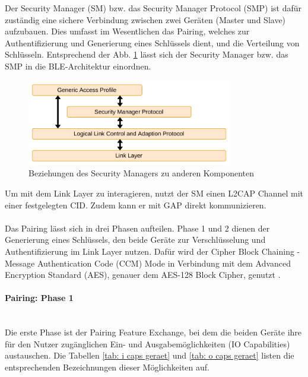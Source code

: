 Der Security Manager (SM) bzw. das Security Manager Protocol (SMP) ist dafür zuständig eine sichere Verbindung zwischen zwei Geräten (Master und Slave) aufzubauen. Dies umfasst im Wesentlichen das Pairing, welches zur Authentifizierung und Generierung eines Schlüssels dient, und die Verteilung von Schlüsseln. Entsprechend der Abb. \ref{fig: smp in bt} lässt sich der Security Manager bzw. das SMP in die BLE-Architektur einordnen.

\begin{figure}[H]
    \centering
    \includegraphics[width=0.8\textwidth]{graphics/smp_in_bt.pdf}
    \caption[Beziehungen des Security Managers zu anderen Komponenten]{Beziehungen des Security Managers zu anderen Komponenten \cite{BtSpec4.0_fig_1958}}
    \label{fig: smp in bt}
\end{figure}

Um mit dem Link Layer zu interagieren, nutzt der SM einen L2CAP Channel mit einer festgelegten CID. Zudem kann er mit GAP direkt kommunizieren.
\\\\
Das Pairing lässt sich in drei Phasen aufteilen. Phase 1 und 2 dienen der Generierung eines Schlüssels, den beide Geräte zur Verschlüsselung und Authentifizierung im Link Layer nutzen. Dafür wird der Cipher Block Chaining - Message Authentication Code (CCM) Mode in Verbindung mit dem Advanced Encryption Standard (AES), genauer dem AES-128 Block Cipher, genutzt \cite{BtSpec4.0_2285}.

\paragraph{Pairing: Phase 1} \mbox{} \vspace{0.2cm} \\
Die erste Phase ist der Pairing Feature Exchange, bei dem die beiden Geräte ihre für den Nutzer zugänglichen Ein- und Ausgabemöglichkeiten (IO Capabilities) austauschen. Die Tabellen \ref{tab: i caps geraet} und \ref{tab: o caps geraet} 
listen die entsprechenden Bezeichnungen dieser Möglichkeiten auf.
\\\\


